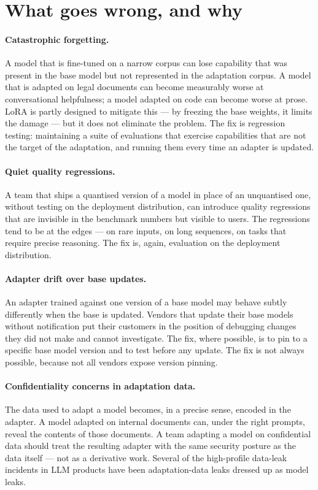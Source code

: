 \section{What goes wrong, and why}

\paragraph{Catastrophic forgetting.} A model that is fine-tuned
on a narrow corpus can lose capability that was present in the
base model but not represented in the adaptation corpus. A
model that is adapted on legal documents can become measurably
worse at conversational helpfulness; a model adapted on code
can become worse at prose. LoRA is partly designed to mitigate
this --- by freezing the base weights, it limits the damage --- but
it does not eliminate the problem. The fix is regression
testing: maintaining a suite of evaluations that exercise
capabilities that are not the target of the adaptation, and
running them every time an adapter is updated.

\paragraph{Quiet quality regressions.} A team that ships a
quantised version of a model in place of an unquantised one,
without testing on the deployment distribution, can introduce
quality regressions that are invisible in the benchmark numbers
but visible to users. The regressions tend to be at the
edges --- on rare inputs, on long sequences, on tasks that
require precise reasoning. The fix is, again, evaluation on
the deployment distribution.

\paragraph{Adapter drift over base updates.} An adapter trained
against one version of a base model may behave subtly
differently when the base is updated. Vendors that update their
base models without notification put their customers in the
position of debugging changes they did not make and cannot
investigate. The fix, where possible, is to pin to a specific
base model version and to test before any update. The fix is
not always possible, because not all vendors expose version
pinning.

\paragraph{Confidentiality concerns in adaptation data.} The
data used to adapt a model becomes, in a precise sense,
encoded in the adapter. A model adapted on internal documents
can, under the right prompts, reveal the contents of those
documents. A team adapting a model on confidential data should
treat the resulting adapter with the same security posture as
the data itself --- not as a derivative work. Several of the
high-profile data-leak incidents in LLM products have been
adaptation-data leaks dressed up as model leaks.

